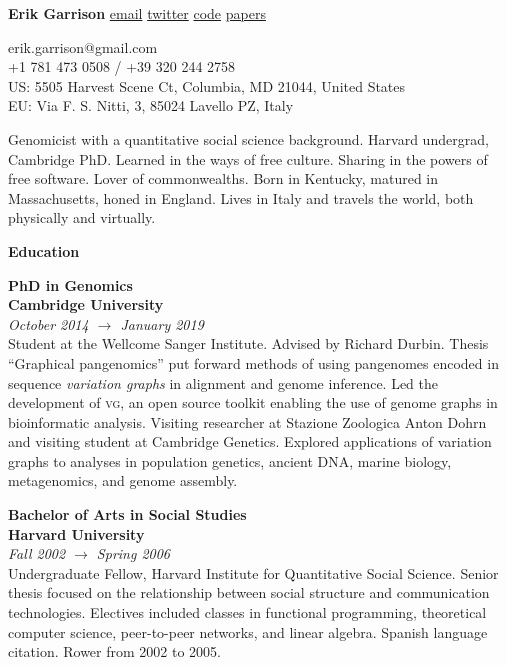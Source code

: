 \documentclass[11pt,hidelinks,letterpaper]{article}
\begin{document}
\begin{flushleft}
{\huge
  \textbf{Erik Garrison}
}
\vspace*{0.05in}
\newline
{\large
      \href{mailto:erik.garrison@gmail.com}{email}
      \href{https://twitter.com/erikgarrison}{twitter}
      \href{https://github.com/ekg}{code}
      \href{https://scholar.google.com/citations?user=d5TKoncAAAAJ&hl=en}{papers}
}
      
{\small
  erik.garrison@gmail.com \\
  +1 781 473 0508 / +39 320 244 2758 \\
  US: 5505 Harvest Scene Ct, Columbia, MD 21044, United States \\
  EU: Via F. S. Nitti, 3, 85024 Lavello PZ, Italy \\
    }
\end{flushleft}

{\large
  Genomicist with a quantitative social science background.
  Harvard undergrad, Cambridge PhD.
  Learned in the ways of free culture.
  Sharing in the powers of free software.
  Lover of commonwealths.
  Born in Kentucky, matured in Massachusetts, honed in England.
  Lives in Italy and travels the world, both physically and virtually.
}

\hfill \break
\noindent
{\LARGE \bf Education}

\hfill \break
\noindent
{\large \bf PhD in Genomics \\
  Cambridge University
} \\
\emph{October 2014 $\to$ January 2019} \\
\noindent
Student at the Wellcome Sanger Institute.
Advised by Richard Durbin.
Thesis ``Graphical pangenomics'' put forward methods of using pangenomes encoded in sequence \emph{variation graphs} in alignment and genome inference.
Led the development of \textsc{vg}, an open source toolkit enabling the use of genome graphs in bioinformatic analysis.
Visiting researcher at Stazione Zoologica Anton Dohrn and visiting student at Cambridge Genetics.
Explored applications of variation graphs to analyses in population genetics, ancient DNA, marine biology, metagenomics, and genome assembly.

\hfill \break
\noindent
{\large \bf Bachelor of Arts in Social Studies \\ Harvard University} \\
\emph{Fall 2002 $\to$ Spring 2006} \\
\noindent
Undergraduate Fellow, Harvard Institute for Quantitative Social Science. Senior thesis focused on the relationship between social structure and communication technologies. Electives included classes in functional programming, theoretical computer science, peer-to-peer networks, and linear algebra. Spanish language citation. Rower from 2002 to 2005.
\end{document}
